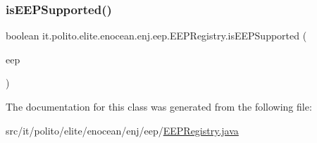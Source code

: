\subsubsection{\texorpdfstring{is\+E\+E\+P\+Supported()}{isEEPSupported()}}
{\footnotesize\ttfamily boolean it.\+polito.\+elite.\+enocean.\+enj.\+eep.\+E\+E\+P\+Registry.\+is\+E\+E\+P\+Supported (\begin{DoxyParamCaption}\item[{\hyperlink{classit_1_1polito_1_1elite_1_1enocean_1_1enj_1_1eep_1_1_e_e_p_identifier}{E\+E\+P\+Identifier}}]{eep }\end{DoxyParamCaption})}



The documentation for this class was generated from the following file\+:\begin{DoxyCompactItemize}
\item 
src/it/polito/elite/enocean/enj/eep/\hyperlink{_e_e_p_registry_8java}{E\+E\+P\+Registry.\+java}\end{DoxyCompactItemize}
